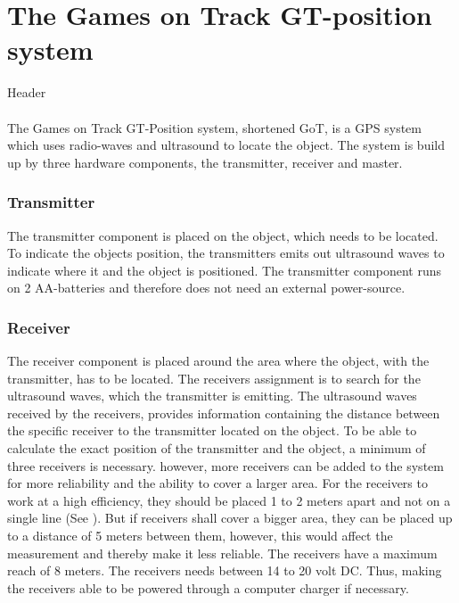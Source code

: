 \section{The Games on Track GT-position system}
Header\\\\
The Games on Track GT-Position system, shortened GoT, is a GPS system which uses radio-waves and ultrasound to locate the object. The system is build up by three hardware components, the transmitter, receiver and master. 

\subsubsection{Transmitter}
The transmitter component is placed on the object, which needs to be located. To indicate the objects position, the transmitters emits out ultrasound waves to indicate where it and the object is positioned. The transmitter component runs on 2 AA-batteries and therefore does not need an external power-source. 

\subsubsection{Receiver}
The receiver component is placed around the area where the object, with the transmitter, has to be located. The receivers assignment is to search for the ultrasound waves, which the transmitter is emitting. The ultrasound waves received by the receivers, provides information containing the distance between the specific receiver to the transmitter located on the object. To be able to calculate the exact position of the transmitter and the object, a minimum of three receivers is necessary. however, more receivers can be added to the system for more reliability and the ability to cover a larger area. For the receivers to work at a high efficiency, they should be placed 1 to 2 meters apart and not on a single line (See ). But if receivers shall cover a bigger area, they can be placed up to a distance of 5 meters between them, however, this would affect the measurement and thereby make it less reliable. The receivers have a maximum reach of 8 meters. The receivers needs between 14 to 20 volt DC. Thus, making the receivers able to be powered through a computer charger if necessary.

